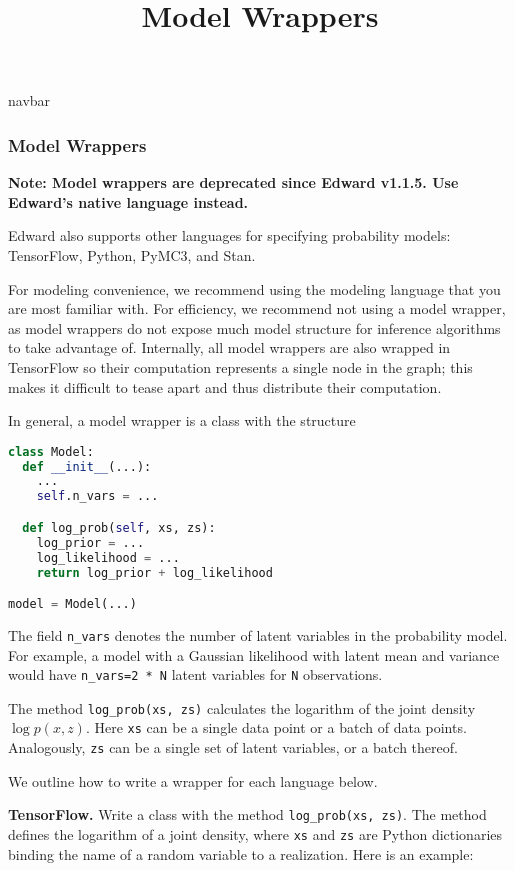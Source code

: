 \title{Model Wrappers}

{{navbar}}

\subsubsection{Model Wrappers}

\textbf{Note: Model wrappers are deprecated since Edward v1.1.5. Use
Edward's native language instead.}

Edward also supports other languages for specifying probability models:
TensorFlow, Python, PyMC3, and Stan.

For modeling convenience, we recommend using the modeling language
that you are most familiar with. For efficiency, we recommend not
using a model wrapper, as model wrappers do not expose much model
structure for inference algorithms to take advantage of.
Internally, all model wrappers are also wrapped in TensorFlow so their
computation represents a single node in the graph; this makes it difficult
to tease apart and thus distribute their computation.

In general, a model wrapper is a class with the structure

\begin{lstlisting}[language=Python]
class Model:
  def __init__(...):
    ...
    self.n_vars = ...

  def log_prob(self, xs, zs):
    log_prior = ...
    log_likelihood = ...
    return log_prior + log_likelihood

model = Model(...)
\end{lstlisting}

The field \texttt{n_vars} denotes the number of latent variables in the
probability model. For example, a model with a Gaussian likelihood with latent
mean and variance would have \texttt{n_vars=2 * N} latent variables for
\texttt{N} observations.

The method \texttt{log_prob(xs, zs)} calculates the logarithm of
the joint density $\log p(x,z)$. Here \texttt{xs} can be a single data
point or a batch of data points. Analogously, \texttt{zs} can be a
single set of latent variables, or a batch thereof.

We outline how to write a wrapper for each language below.

\textbf{TensorFlow.}
Write a class with the method \texttt{log_prob(xs, zs)}. The method defines
the logarithm of a joint density, where \texttt{xs} and \texttt{zs} are Python
dictionaries binding the name of a random variable to
a realization.
Here is an example:


